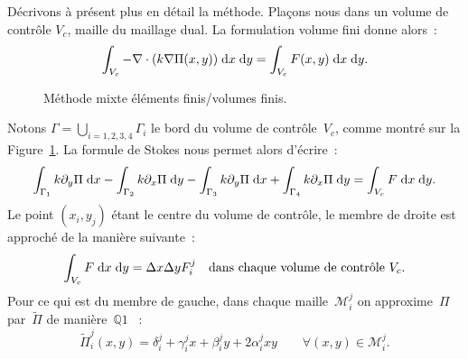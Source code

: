 \documentclass[main.tex]{subfiles}
\begin{document}
Décrivons à présent plus en détail la méthode. 
Plaçons nous dans un volume de contrôle $V_c$, maille du maillage dual.  La formulation volume fini donne alors~:
\begin{equation}
\int_{V_c} -\nabla\cdot ( k \nabla \Pi(x,y) ) \;{\rm d}x\;{\rm d}y = \int_{V_c}F(x,y) \;{\rm d}x\;{\rm d}y.
\end{equation}
\begin{figure}
\centering
\resizebox{.7\textwidth}{!}{}
\caption{\label{fig:methode_mixte_EFVF}Méthode mixte éléments finis/volumes finis.}
\end{figure}
Notons $\Gamma=\displaystyle \bigcup_{i=1,2,3,4} \Gamma_i$ le bord du volume de contrôle~$V_c$, comme montré sur la Figure~\ref{fig:methode_mixte_EFVF}. La formule de Stokes nous permet alors d'écrire~:
\begin{equation}
\int_{\Gamma_1}k \partial_y \Pi \;{\rm d}x - \int_{\Gamma_2}k \partial_x \Pi \;{\rm d}y - \int_{\Gamma_3}k \partial_y \Pi \;{\rm d}x + \int_{\Gamma_4}k \partial_x \Pi \;{\rm d}y = \int_{V_c}F \;{\rm d}x \;{\rm d}y.
\end{equation}
Le point $(x_i,y_j)$ étant le centre du volume de contrôle, le membre de droite est approché de la manière suivante~:
\begin{equation}
\int_{V_c}F \;{\rm d}x \;{\rm d}y = \Delta x \Delta y F_i^j \quad \textrm{dans chaque volume de contrôle~} V_c.
\end{equation}
Pour ce qui est du membre de gauche, dans chaque maille~$\mathcal{M}_i^j$ on approxime~$\Pi$ par~$\tilde{\Pi}$ de manière~$\mathds{Q}1$ \ie~:
\begin{equation}\label{eq:anx_form_var_pr_eq_poisson}
\tilde{\Pi}_i^j(x,y) = \delta_i^j + \gamma_i^jx + \beta_i^jy + 2\alpha_i^jxy  \qquad \forall (x,y) \in \mathcal{M}_i^j.
\end{equation}
\end{document}
